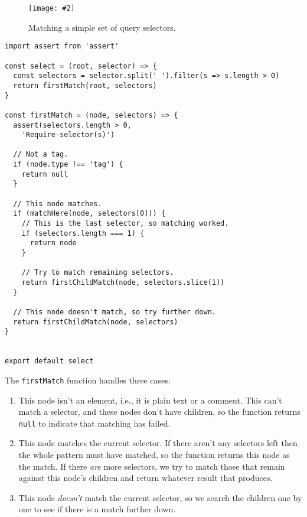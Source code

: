 \documentclass[krantzl]{krantz}
\newcommand{\figpdf}[4]{\begin{figure}%
\centering%
\texttt{[image: \#2]}%
\caption{#3}%
\label{#1}%
\end{figure}}
\begin{document}
\figpdf{pattern-matching-query-selectors}{./pattern-matching/query-selectors.pdf}{Matching a simple set of query selectors.}{0.6}


\begin{lstlisting}[frame=single,frameround=tttt]
import assert from 'assert'

const select = (root, selector) => {
  const selectors = selector.split(' ').filter(s => s.length > 0)
  return firstMatch(root, selectors)
}

const firstMatch = (node, selectors) => {
  assert(selectors.length > 0,
    'Require selector(s)')

  // Not a tag.
  if (node.type !== 'tag') {
    return null
  }

  // This node matches.
  if (matchHere(node, selectors[0])) {
    // This is the last selector, so matching worked.
    if (selectors.length === 1) {
      return node
    }

    // Try to match remaining selectors.
    return firstChildMatch(node, selectors.slice(1))
  }

  // This node doesn't match, so try further down.
  return firstChildMatch(node, selectors)
}


export default select
\end{lstlisting}



The \texttt{firstMatch} function handles three cases:

\begin{enumerate}

\item 

This node isn't an element, i.e., it is plain text or a comment.
    This can't match a selector, and these nodes don't have children,
    so the function returns \texttt{null} to indicate that matching has failed.



\item 

This node matches the current selector.
    If there aren't any selectors left then the whole pattern must have matched,
    so the function returns this node as the match.
    If there \emph{are} more selectors,
    we try to match those that remain against this node's children
    and return whatever result that produces.



\item 

This node \emph{doesn't} match the current selector,
    so we search the children one by one to see if there is a match further down.



\end{enumerate}
\end{document}
